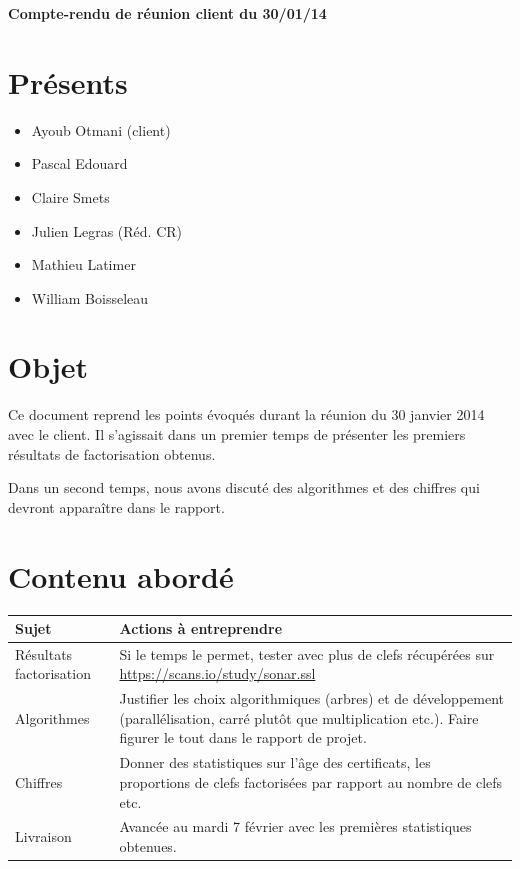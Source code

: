 \documentclass[a4paper,11pt,french]{article}
\author{\hmwkAuthorName}
\date{} %
\newcommand{\hmwkDocName}{Compte-rendu de réunion client du 30/01/14} %
\begin{document}
\pagestyle{fancy}

\begin{center}\textbf{\Huge{\hmwkDocName}}\end{center}
	
\section{Présents}
\begin{itemize}
\item Ayoub Otmani (client)
\item Pascal Edouard 
\item Claire Smets
\item Julien Legras (Réd. CR) 
\item Mathieu Latimer
\item William Boisseleau
\end{itemize}

\section{Objet}
Ce document reprend les points évoqués durant la réunion du 30 janvier 2014 avec le client. Il s'agissait dans un premier temps de présenter les premiers résultats de factorisation obtenus. 

Dans un second temps, nous avons discuté  des algorithmes et des chiffres qui devront apparaître dans le rapport.

\section{Contenu abordé}
\begin{center}

\begin{tabular}{ | l | p{14cm} |}
	\hline
   \textbf{Sujet} & \textbf{Actions à entreprendre}    \\ \hline
Résultats factorisation & Si le temps le permet, tester avec plus de clefs récupérées sur \url{https://scans.io/study/sonar.ssl}\\
 \hline
 Algorithmes & Justifier les choix algorithmiques (arbres) et de développement (parallélisation, carré plutôt que multiplication etc.). Faire figurer le tout dans le rapport de projet.\\
 \hline
Chiffres & Donner des statistiques sur l'âge des certificats, les proportions de clefs factorisées par rapport au nombre de clefs etc.\\
 \hline
 Livraison & Avancée au mardi 7 février avec les premières statistiques obtenues.\\
 \hline
 \end{tabular}
 
\end{center}
\end{document}
